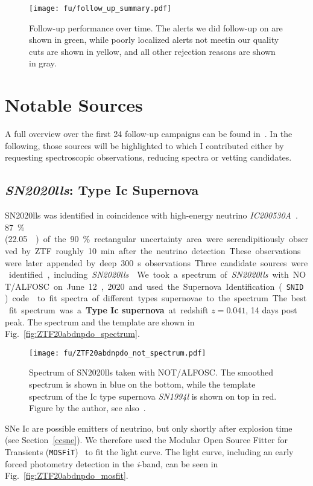 \begin{figure}[h!]
    \texttt{[image: fu/follow\_up\_summary.pdf]}
    \caption[Follow-up performance over time]{Follow-up performance over time. The alerts we did follow-up on are shown in green, while poorly localized alerts not meetin our quality cuts are shown in yellow, and all other rejection reasons are shown in gray.}
\end{figure}

\section{Notable Sources}
A full overview over the first 24 follow-up campaigns can be found in~. In the following, those sources will be highlighted to which I contributed either by requesting spectroscopic observations, reducing spectra or vetting candidates.

\subsection{\emph{SN2020lls}: Type Ic Supernova}\label{SN2020lls}
SN2020lls was identified in coincidence with high-energy neutrino \emph{IC200530A}~. \SI{87}{\percent} (\SI{22.05}{\square\deg}) of the \SI{90}{\percent} rectangular uncertainty area were serendipitiously observed by ZTF roughly \SI{10}{\minute} after the neutrino detection. These observations were later appended by deep \SI{300}{\second} observations Three candidate sources were identified, including \emph{SN2020lls}~.

We took a spectrum of \emph{SN2020lls} with NOT/ALFOSC on June 12, 2020 and used the Supernova Identification (\texttt{SNID}) code~ to fit spectra of different types supernovae to the spectrum. The best fit spectrum was a \textbf{Type Ic supernova} at redshift $z=0.041$, 14 days post peak. The spectrum and the template are shown in Fig.~\ref{fig:ZTF20abdnpdo_spectrum}.

\begin{figure}[h!]
    \texttt{[image: fu/ZTF20abdnpdo\_not\_spectrum.pdf]}
    \caption[SN2020lls spectrum]{Spectrum of SN2020lls taken with NOT/ALFOSC. The smoothed spectrum is shown in blue on the bottom, while the template spectrum of the Ic type supernova \emph{SN1994l} is shown on top in red. Figure by the author, see also~\cite{Stein2023a}.}
\end{figure}
SNe Ic are possible emitters of neutrino, but only shortly after explosion time (see Section~\ref{ccsne}). We therefore used the Modular Open Source Fitter for Transients (\texttt{MOSFiT})~ to fit the light curve. The light curve, including an early forced photometry detection in the \textit{i}-band, can be seen in Fig.~\ref{fig:ZTF20abdnpdo_mosfit}.

